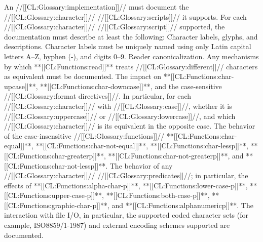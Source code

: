 




   An //[[CL:Glossary:implementation]]// must document the //[[CL:Glossary:character]]// //[[CL:Glossary:scripts]]// 
   it supports. For each //[[CL:Glossary:character]]// //[[CL:Glossary:script]]// supported,
   the documentation must describe at least the following:
\beginlist
\itemitem{\bull}
   Character labels, glyphs, and descriptions.
   Character labels must be uniquely named using only Latin capital letters A--Z,
   hyphen (-), and digits 0--9.
\itemitem{\bull}
   Reader canonicalization.
   Any mechanisms by which **[[CL:Functions:read]]** treats
   //[[CL:Glossary:different]]// characters as equivalent must be documented.
\itemitem{\bull}
   The impact on **[[CL:Functions:char-upcase]]**,
		 **[[CL:Functions:char-downcase]]**,
	     and the case-sensitive //[[CL:Glossary:format directives]]//.
   In particular, for each //[[CL:Glossary:character]]// with //[[CL:Glossary:case]]//,
   whether it is //[[CL:Glossary:uppercase]]// or //[[CL:Glossary:lowercase]]//,
   and which //[[CL:Glossary:character]]// is its equivalent in the opposite case.
\itemitem{\bull}
   The behavior of the case-insensitive //[[CL:Glossary:functions]]//
     **[[CL:Functions:char-equal]]**, **[[CL:Functions:char-not-equal]]**,
     **[[CL:Functions:char-lessp]]**, **[[CL:Functions:char-greaterp]]**, 
     **[[CL:Functions:char-not-greaterp]]**, and **[[CL:Functions:char-not-lessp]]**.
\itemitem{\bull}
   The behavior of any //[[CL:Glossary:character]]// //[[CL:Glossary:predicates]]//;
   in particular, the effects of
   **[[CL:Functions:alpha-char-p]]**,
   **[[CL:Functions:lower-case-p]]**,
   **[[CL:Functions:upper-case-p]]**,
   **[[CL:Functions:both-case-p]]**,
   **[[CL:Functions:graphic-char-p]]**, 
   and
   **[[CL:Functions:alphanumericp]]**.
\itemitem{\bull}
   The interaction with file I/O, in particular,
   the supported coded character sets (for example, ISO8859/1-1987)
   and external encoding schemes supported are documented.
\endlist


\endsubsection%
